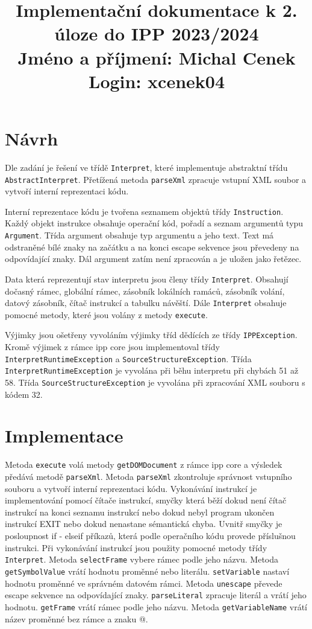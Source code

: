 \documentclass[11pt, letterpaper]{article}
\title{
    Implementační dokumentace k 2. úloze do IPP 2023/2024 \\
    Jméno a příjmení: Michal Cenek \\
    Login: xcenek04
}
\date{}
\begin{document}
\maketitle

\section{Návrh}

Dle zadání je řešení ve třídě \texttt{Interpret}, které implementuje abstraktní třídu \texttt{AbstractInterpret}.
Přetížená metoda \texttt{parseXml} zpracuje vstupní XML soubor a vytvoří interní reprezentaci kódu.


Interní reprezentace kódu je tvořena seznamem objektů třídy \texttt{Instruction}. Každý objekt instrukce obsahuje operační kód, pořadí a seznam argumentů typu \texttt{Argument}. Třída argument obsahuje typ argumentu a jeho text.
Text má odstraněné bílé znaky na začátku a na konci escape sekvence jsou převedeny na odpovídající znaky.
Dál argument zatím není zpracován a je uložen jako řetězec.


Data která reprezentují stav interpretu jsou členy třídy \texttt{Interpret}. Obsahují dočasný rámec,
globální rámec, zásobník lokálních ramáců, zásobník volání, datový zásobník, čítač instrukcí a tabulku návěští.
Dále \texttt{Interpret} obsahuje pomocné metody, které jsou volány z metody \texttt{execute}.


Výjimky jsou ošetřeny vyvoláním výjimky tříd dědících ze třídy \texttt{IPPException}.
Kromě výjimek z rámce ipp core jsou implementoval třídy \texttt{InterpretRuntimeException} a \texttt{SourceStructureException}.
Třída \texttt{InterpretRuntimeException} je vyvolána při běhu interpretu při chybách 51 až 58.
Třída \texttt{SourceStructureException} je vyvolána při zpracování XML souboru s kódem 32.

\section{Implementace}

Metoda \texttt{execute} volá metody \texttt{getDOMDocument} z rámce ipp core a výsledek předává metodě \texttt{parseXml}.
Metoda \texttt{parseXml} zkontroluje správnost vstupního souboru a vytvoří interní reprezentaci kódu.
Vykonávání instrukcí je implementování pomocí čítače instrukcí, smyčky která běží dokud není čítač instrukcí na konci seznamu instrukcí nebo dokud nebyl program ukončen instrukcí EXIT nebo dokud nenastane sémantická chyba.
Uvnitř smyčky je posloupnost if - elseif příkazů, která podle operačního kódu provede příslušnou instrukci.
Při vykonávání instrukcí jsou použity pomocné metody třídy \texttt{Interpret}.
Metoda \texttt{selectFrame} vybere rámec podle jeho názvu.
Metoda \texttt{getSymbolValue} vrátí hodnotu proměnné nebo literálu.
\texttt{setVariable} nastaví hodnotu proměnné ve správném datovém rámci.
Metoda \texttt{unescape} převede escape sekvence na odpovídající znaky.
\texttt{parseLiteral} zpracuje literál a vrátí jeho hodnotu.
\texttt{getFrame} vrátí rámec podle jeho názvu.
Metoda \texttt{getVariableName} vrátí název proměnné bez rámce a znaku @.
\end{document}
